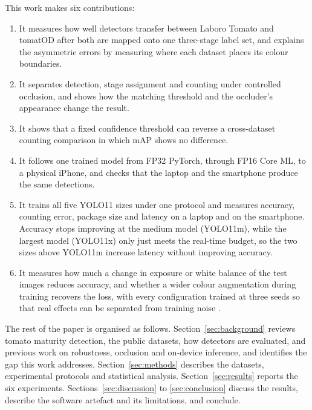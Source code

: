 This work makes six contributions:
\begin{enumerate}
\item It measures how well detectors transfer between Laboro Tomato and
tomatOD after both are mapped onto one three-stage label set, and explains the
asymmetric errors by measuring where each dataset places its colour boundaries.
\item It separates detection, stage assignment and counting under controlled
occlusion, and shows how the matching threshold and the occluder's appearance
change the result.
\item It shows that a fixed confidence threshold can reverse a cross-dataset
counting comparison in which mAP shows no difference.
\item It follows one trained model from FP32 PyTorch, through FP16 Core ML, to
a physical iPhone, and checks that the laptop and the smartphone produce the same
detections.
\item It trains all five YOLO11 sizes under one protocol and measures accuracy,
counting error, package size and latency on a laptop and on the smartphone. Accuracy
stops improving at the medium model (YOLO11m), while the largest model
(YOLO11x) only just meets the real-time budget, so the two sizes above YOLO11m
increase latency without improving accuracy.
\item It measures how much a change in exposure or white balance of the test
images reduces accuracy, and whether a wider colour augmentation during
training recovers the loss, with every configuration trained at three seeds so
that real effects can be separated from training noise
\cite{bouthillier2021variance}.
\end{enumerate}

The rest of the paper is organised as follows.
Section~\ref{sec:background} reviews tomato maturity detection, the public
datasets, how detectors are evaluated, and previous work on robustness,
occlusion and on-device inference, and identifies the gap this work addresses.
Section~\ref{sec:methods} describes the datasets, experimental protocols and
statistical analysis. Section~\ref{sec:results} reports the six experiments.
Sections~\ref{sec:discussion} to \ref{sec:conclusion} discuss the results,
describe the software artefact and its limitations, and conclude.

